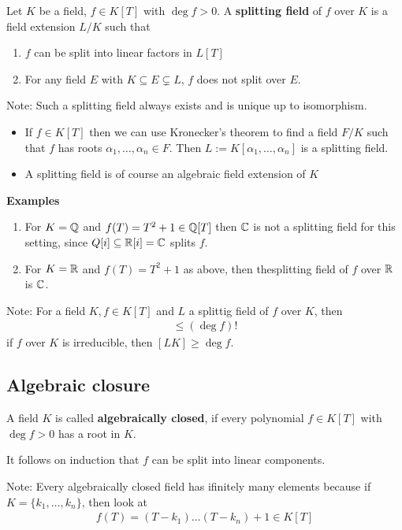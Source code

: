 \begin{definition}
	Let $K$ be a field, $f \in K[T]$ with $\deg f > 0$. A \textbf{splitting field} of $f$ over $K$ is a field extension $L/K$ such that
	\begin{enumerate}
		\item $f$ can be split into linear factors in $L[T]$
		\item For any field $E$ with $K \subseteq E \subsetneq L$, $f$ does not split over $E$.
	\end{enumerate}
\end{definition}
Note: Such a splitting field always exists and is unique up to isomorphism.

\begin{itemize}
	\item If $f \in K[T]$ then we can use Kronecker's theorem to find a field $F/K$ such that $f$ has roots $\alpha_{1}, \ldots, \alpha_{n}\in F$. Then $L := K[\alpha_1,\ldots,\alpha_n]$ is a splitting field.
	\item A splitting field is of course an algebraic field extension of $K$
\end{itemize}


\textbf{Examples}
\begin{enumerate}
	\item For $K = \mathbb{Q}$ and $f(T) = T^2 + 1 \in \mathbb{Q}[T]$ then $\mathbb{C}$ is not a splitting field for this setting, since $Q[i] \subseteq \mathbb{R}[i] = \mathbb{C}$ splits $f$.
	\item For $K = \mathbb{R}$ and $f(T) = T^2 + 1$ as above, then thesplitting field of $f$ over $\mathbb{R}$ is $\mathbb{C}$.
\end{enumerate}

Note: For a field $K, f \in K[T]$ and $L$ a splittig field of $f$ over $K$, then
\begin{align*}
	[L:K] \leq (\deg f)!
\end{align*}
if $f$ over $K$ is irreducible, then $[L K] \geq \deg f$.


\subsection{Algebraic closure}

\begin{definition}[]
	A field $K$ is called \textbf{algebraically closed}, if every polynomial $f \in K[T]$ with $\deg f > 0$ has a root in $K$.

	It follows on induction that $f$ can be split into linear components.
\end{definition}
Note: Every algebraically closed field has ifinitely many elements because if $K= \{k_1, \ldots, k_n\}$, then look at 
\begin{align*}
	f(T) = (T - k_1)\dots (T - k_n) + 1 \in K[T]
\end{align*}


